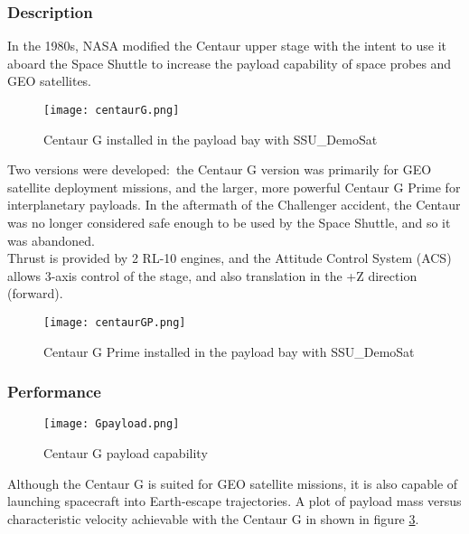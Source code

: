 \documentclass[Space_Shuttle_Ultra_Manual.tex]{subfiles}
\begin{document}
\begin{multicols*}{2}
\renewcommand{\cfttoctitlefont}{\bf}
\localtableofcontents
\subsubsection{Description}
\noindent
In the 1980s, NASA modified the Centaur upper stage with the intent to use it aboard the Space Shuttle to increase the payload capability of space probes and GEO satellites.\\

\begin{figure}[H]
	\centering
	\captionsetup{justification=centering}
  \texttt{[image: centaurG.png]}
  \caption{Centaur G installed in the payload bay with SSU\_DemoSat}
  \label{fig:centaurG}
\end{figure}

Two versions were developed$\colon$ the Centaur G version was primarily for GEO satellite deployment missions, and the larger, more powerful Centaur G Prime for interplanetary payloads. In the aftermath of the Challenger accident, the Centaur was no longer considered safe enough to be used by the Space Shuttle, and so it was abandoned.
\\
Thrust is provided by 2 RL-10 engines, and the Attitude Control System (ACS) allows 3-axis control of the stage, and also translation in the +Z direction (forward).

\begin{figure}[H]
	\centering
	\captionsetup{justification=centering}
  \texttt{[image: centaurGP.png]}
  \caption{Centaur G Prime installed in the payload bay with SSU\_DemoSat}
  \label{fig:centaurGP}
\end{figure}

\subsubsection{Performance}
\begin{figure}[H]
	\centering
	\captionsetup{justification=centering}
  \texttt{[image: Gpayload.png]}
  \caption{Centaur G payload capability}
  \label{fig:Gpayload}
\end{figure}
Although the Centaur G is suited for GEO satellite missions, it is also capable of launching spacecraft into Earth-escape trajectories. A plot of payload mass versus characteristic velocity achievable with the Centaur G in shown in figure \ref{fig:Gpayload}.


\end{multicols*}
\end{document}

